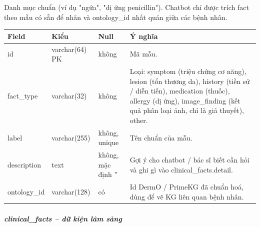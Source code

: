 Danh mục chuẩn (ví dụ "ngứa", "dị ứng penicillin"). Chatbot chỉ được trích fact theo mẫu có sẵn để nhãn và ontology\_id nhất quán giữa các bệnh nhân.
\begin{longtable}{|>{\raggedright\arraybackslash}p{0.250\dimexpr\linewidth-8\tabcolsep\relax}|>{\raggedright\arraybackslash}p{0.250\dimexpr\linewidth-8\tabcolsep\relax}|>{\raggedright\arraybackslash}p{0.250\dimexpr\linewidth-8\tabcolsep\relax}|>{\raggedright\arraybackslash}p{0.250\dimexpr\linewidth-8\tabcolsep\relax}|}
\hline
\textbf{Field} & \textbf{Kiểu} & \textbf{Null} & \textbf{Ý nghĩa} \\ \hline
\endhead
id & varchar(64) PK & không & Mã mẫu. \\ \hline
fact\_type & varchar(32) & không & Loại: symptom (triệu chứng cơ năng), lesion (tổn thương da), history (tiền sử / diễn tiến), medication (thuốc), allergy (dị ứng), image\_finding (kết quả phân loại ảnh, chỉ là giả thuyết), other. \\ \hline
label & varchar(255) & không, unique & Tên chuẩn của mẫu. \\ \hline
description & text & không, mặc định '' & Gợi ý cho chatbot / bác sĩ biết cần hỏi và ghi gì vào clinical\_facts.detail. \\ \hline
ontology\_id & varchar(128) & có & Id DermO / PrimeKG đã chuẩn hoá, dùng để vẽ KG liên quan bệnh nhân. \\ \hline
\end{longtable}

\subparagraph{clinical\_facts -- dữ kiện lâm sàng}

